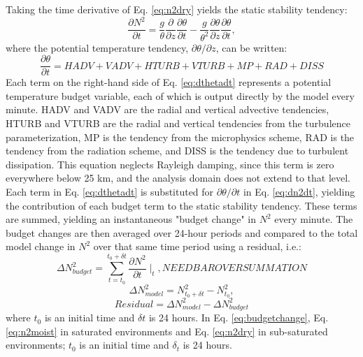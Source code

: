 \documentclass{ametsoc}
\begin{document}
Taking the time derivative of Eq. \ref{eq:n2dry} yields the static stability tendency:
   \begin{equation} \label{eq:dn2dt}
   \frac{\partial N^2}{\partial t} = \frac{g}{\theta}\frac{\partial}{\partial z}\frac{\partial \theta}{\partial t}-\frac{g}{\theta^2}\frac{\partial \theta}{\partial z}\frac{\partial \theta}{\partial t},
   \end{equation}
where the potential temperature tendency, $\partial \theta/\partial z$, can be written:
   \begin{equation} \label{eq:dthetadt}
   \frac{\partial \theta}{\partial t} = HADV+VADV+HTURB+VTURB+MP+RAD+DISS 
   \end{equation}
Each term on the right-hand side of Eq. \ref{eq:dthetadt} represents a potential temperature budget variable, each of which is output directly by the model every minute.
HADV and VADV are the radial and vertical advective tendencies, HTURB and VTURB are the radial and vertical tendencies from the turbulence parameterization, MP is the tendency from the microphysics scheme, RAD is the tendency from the radiation scheme, and DISS is the tendency due to turbulent dissipation.
This equation neglects Rayleigh damping, since this term is zero everywhere below 25 km, and the analysis domain does not extend to that level.
Each term in Eq. \ref{eq:dthetadt} is substituted for ${\partial \theta}/{\partial t}$ in Eq. \ref{eq:dn2dt}, yielding the contribution of each budget term to the static stability tendency.
These terms are summed, yielding an instantaneous "budget change" in $N^2$ every minute.
The budget changes are then averaged over 24-hour periods and compared to the total model change in $N^2$ over that same time period using a residual, i.e.:
   \begin{equation} \label{eq:budgetchange}
   \Delta N^2_{budget} = \sum_{t=t_0}^{t_0+\delta t} \frac{\partial N^2}{\partial t}\mid_t, NEED BAR OVER SUMMATION
   \end{equation}
   \begin{equation} \label{eq:modelchange}
   \Delta N^2_{model} = N^2_{t_0+\delta t}-N^2_{t_0},
   \end{equation}
   \begin{equation} \label{eq:residual}
   Residual = \Delta N^2_{model}-\Delta N^2_{budget}
   \end{equation}
where $t_0$ is an initial time and $\delta t$ is 24 hours.
In Eq. \ref{eq:budgetchange}, Eq. \ref{eq:n2moist} in saturated environments and Eq. \ref{eq:n2dry} in sub-saturated environments; $t_0$ is an initial time and $\delta_t$ is 24 hours.
\end{document}

